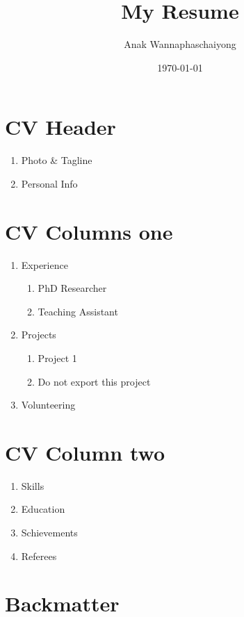 \documentclass[11pt]{article}
\author{Anak Wannaphaschaiyong}
\date{\today}
\title{My Resume}
\begin{document}
\section{CV Header}
\label{sec:orga991c17}
\begin{enumerate}
\item Photo \& Tagline
\label{sec:orgb766649}
\item Personal Info
\label{sec:org314d5ab}
\makecvheader
\end{enumerate}
\section{CV Columns one}
\label{sec:org34d0a63}
\begin{enumerate}
\item Experience
\label{sec:org537ff93}
\begin{enumerate}
\item PhD Researcher
\label{sec:orge40af1a}
\item Teaching Assistant
\label{sec:org833d683}
\end{enumerate}
\item Projects
\label{sec:orgabe0870}
\begin{enumerate}
\item Project 1
\label{sec:orgabd4245}
\item Do not export this project
\label{sec:org52931a2}
\end{enumerate}
\item Volunteering
\label{sec:orgd442515}
\end{enumerate}
\section{CV Column two}
\label{sec:orge615567}
\begin{enumerate}
\item Skills
\label{sec:orgc176cb4}
\item Education
\label{sec:org470c13f}
\item Schievements
\label{sec:org4afc3d2}
\item Referees
\label{sec:org7ba073c}
\end{enumerate}
\section{Backmatter}
\label{sec:orgbcd5f3a}
\end{document}
